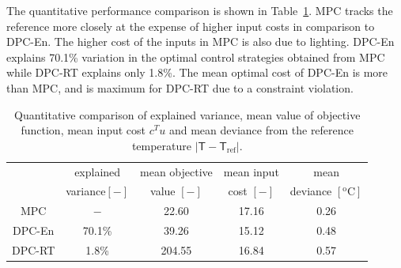 The quantitative performance comparison is shown in Table~\ref{T:comparison}. MPC tracks the reference more closely at the expense of higher input costs in comparison to DPC-En. The higher cost of the inputs in MPC is also due to lighting. DPC-En explains 70.1\% variation in the optimal control strategies obtained from MPC while DPC-RT explains only 1.8\%. The mean optimal cost of DPC-En is more than MPC, and is maximum for DPC-RT due to a constraint violation.

\begin{table}[h!]
	\centering
	\begin{tabular}{ccccc}
		\toprule
		& explained & mean objective& mean input  & mean  \\
		&  variance$[\mathrm{-}]$ & value $[\mathrm{-}]$ & cost $[-]$ & deviance $[\mathrm{^oC}]$ \\     
		\midrule
		MPC    &  $\mathrm{-}$ &  22.60 & 17.16  &  0.26  \\
		DPC-En   & 70.1\% &  39.26  & 15.12 &  0.48 \\
		DPC-RT  & 1.8\% & 204.55 & 16.84 &  0.57 \\
		\bottomrule
	\end{tabular}
	\caption{Quantitative comparison of explained variance, mean value of objective function, mean input cost $c^Tu$ and mean deviance from the reference temperature $|\mathsf{T}-\mathsf{T}_{\mathrm{ref}}|$.}
	\captionsetup{justification=centering}
	\label{T:comparison}
\end{table}

